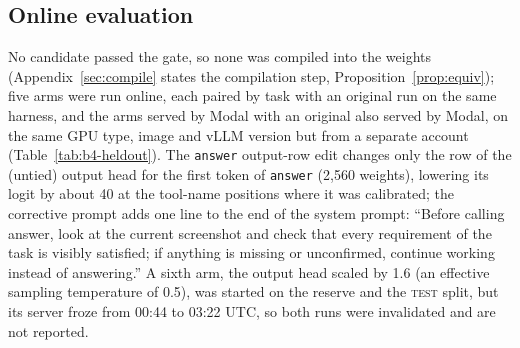 \subsection{Online evaluation}
\label{sec:online}
No candidate passed the gate, so none was compiled into the weights (Appendix~\ref{sec:compile} states the compilation step, Proposition~\ref{prop:equiv}); five arms were run online, each paired by task with an original run on the same harness, and the arms served by Modal with an original also served by Modal, on the same GPU type, image and vLLM version but from a separate account (Table~\ref{tab:b4-heldout}). The \texttt{answer} output-row edit changes only the row of the (untied) output head for the first token of \texttt{answer} (2{,}560 weights), lowering its logit by about 40 at the tool-name positions where it was calibrated; the corrective prompt adds one line to the end of the system prompt: ``Before calling answer, look at the current screenshot and check that every requirement of the task is visibly satisfied; if anything is missing or unconfirmed, continue working instead of answering.'' A sixth arm, the output head scaled by 1.6 (an effective sampling temperature of 0.5), was started on the reserve and the \textsc{test} split, but its server froze from 00:44 to 03:22 UTC, so both runs were invalidated and are not reported. %
